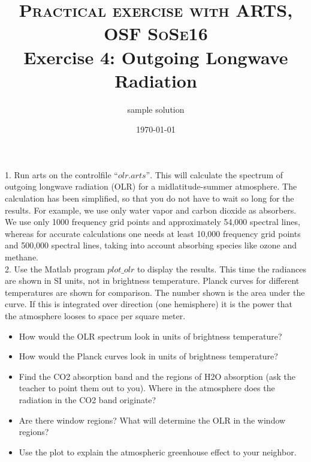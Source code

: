 \documentclass[paper=a4, fontsize=11pt]{scrartcl} %
\title{	
\normalfont \normalsize 
\textsc{Practical exercise with ARTS, OSF SoSe16} \\ [25pt] %
\huge Exercise 4: Outgoing Longwave Radiation \\ %
}
\author{sample solution}
\date{\normalsize\today}
\numberwithin{figure}{section}
\begin{document}
\maketitle

1. Run arts on the controlfile $“olr.arts”$. This will calculate the spectrum of outgoing 
longwave radiation (OLR) for a midlatitude-summer atmosphere. The calculation has been simplified, 
so that you do not have to wait so long for the results. For example, we use only water vapor and 
carbon dioxide as absorbers. We use only 1000 frequency grid points and approximately 54,000 spectral 
lines, whereas for accurate calculations one needs at least 10,000 frequency grid points and 500,000 
spectral lines, taking into account absorbing species like ozone and methane.\ \\

2. Use the Matlab program $plot\_olr$ to display the results. This time the radiances 
are shown in SI units, not in brightness temperature.  Planck curves for different temperatures are 
shown for comparison. The number shown is the area under the curve. If this is integrated over 
direction (one hemisphere) it is the power that the atmosphere looses to space per square meter. \ \\

\begin{itemize}
	\item How would the OLR spectrum look in units of brightness temperature?
	\item How would the Planck curves look in units of brightness temperature?
	\item Find the CO2 absorption band and the regions of H2O absorption (ask the teacher 
	    to point them out to you). Where in the atmosphere does the radiation in the CO2 band originate? 
	\item Are there window regions? What will determine the OLR in the window regions?
	\item Use the plot to explain the atmospheric greenhouse effect to your neighbor. \ \\
\end{itemize}
\end{document}
